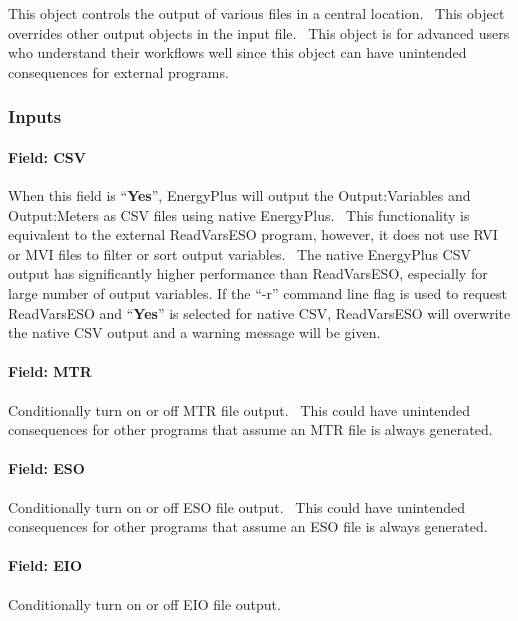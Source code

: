 This object controls the output of various files in a central location.~ This object overrides other output objects in the input file.~ This object is for advanced users who understand their workflows well since this object can have unintended consequences for external programs.

\subsubsection{Inputs}\label{outputcontrolfiles-inputs}

\paragraph{Field: CSV}\label{field-csv}

When this field is ``\textbf{Yes}'', EnergyPlus will output the Output:Variables and Output:Meters as CSV files using native EnergyPlus.~ This functionality is equivalent to the external ReadVarsESO program, however, it does not use RVI or MVI files to filter or sort output variables.~ The native EnergyPlus CSV output has significantly higher performance than ReadVarsESO, especially for large number of output variables. If the ``-r'' command line flag is used to request ReadVarsESO and ``\textbf{Yes}'' is selected for native CSV, ReadVarsESO will overwrite the native CSV output and a warning message will be given.

\paragraph{Field: MTR}\label{field-mtr}

Conditionally turn on or off MTR file output.~ This could have unintended consequences for other programs that assume an MTR file is always generated.

\paragraph{Field: ESO}\label{field-eso}

Conditionally turn on or off ESO file output.~ This could have unintended consequences for other programs that assume an ESO file is always generated.

\paragraph{Field: EIO}\label{field-eio}

Conditionally turn on or off EIO file output.

